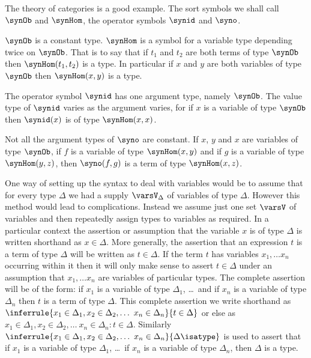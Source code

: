 The theory of categories is a good example.
%
The sort symbols we shall call $\synOb$ and $\synHom$, the operator symbols $\synid$ and $\syno$.

$\synOb$ is a constant type.  $\synHom$ is a symbol for a variable type depending twice on $\synOb$.
%
That is to say that if $t_1$ and $t_2$ are both terms of type $\synOb$ then $\synHom(t_1,t_2)$ is a type.
%
In particular if $x$ and $y$ are both variables of type $\synOb$ then $\synHom(x,y)$ is a type.


The operator symbol $\synid$ has one argument type, namely $\synOb$.
%
The value type of $\synid$ varies as the argument varies, for if $x$ is a variable of type $\synOb$ then $\synid(x)$ is of type $\synHom(x,x)$.

Not all the argument types of $\syno$ are constant.
%
If $x$, $y$ and $x$ are variables of type $\synOb$, if $f$ is a variable of type $\synHom(x,y)$ and if $g$ is a variable of type $\synHom(y,z)$, then $\syno(f,g)$ is a term of type $\synHom(x,z)$.

One way of setting up the syntax to deal with variables would be to assume that for every type $\Delta$ we had a supply $\varsV_\Delta$ of variables of type $\Delta$.
%
However this method would lead to complications.
%
Instead we assume just one set $\varsV$ of variables and then repeatedly assign types to variables as required.
%
In a particular context the assertion or assumption that the variable $x$ is of type $\Delta$ is written shorthand as $x \in \Delta$.
%
More generally, the assertion that an expression $t$ is a term of type $\Delta$ will be written as $t \in \Delta$.
%
If the term $t$ has variables $x_1,\ldots x_n$ occurring within it then it will only make sense to assert $t \in \Delta$ under an assumption that $x_1,\ldots x_n$ are variables of particular types.
%
The complete assertion will be of the form: if $x_1$ is a variable of type $\Delta_1$, \ldots\ and if $x_n$ is a variable of type $\Delta_n$ then $t$ is a term of type $\Delta$.
%
This complete assertion we write shorthand as
%
$ \inferrule
{ x_1 \in \Delta_1, x_2 \in \Delta_2, \ldots\ x_n \in \Delta_n }
{ t \in \Delta } $
%
or else as $x_1 \in \Delta_1, x_2 \in \Delta_2, \ldots\ x_n \in \Delta_n : t \in \Delta$.
%
%
Similarly
%
$ \inferrule
{ x_1 \in \Delta_1, x_2 \in \Delta_2, \ldots\ x_n \in \Delta_n }
{ \Delta \isatype } $
%
is used to assert that if $x_1$ is a variable of type $\Delta_1$, \ldots\ if $x_n$ is a variable of type $\Delta_n$, then $\Delta$ is a type.

